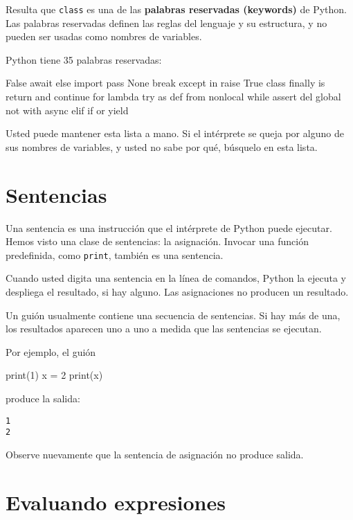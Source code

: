 Resulta que \texttt{class} es una de las \textbf{palabras reservadas
(keywords)} de Python. Las palabras reservadas definen las reglas
del lenguaje y su estructura, y no pueden ser usadas como nombres
de variables.


Python tiene 35 palabras reservadas:

\begin{pythoncode}
False      await      else       import     pass
None       break      except     in         raise
True       class      finally    is         return
and        continue   for        lambda     try
as         def        from       nonlocal   while
assert     del        global     not        with
async      elif       if         or         yield
\end{pythoncode}
 

Usted puede mantener esta lista a mano. Si el intérprete se queja
por alguno de sus nombres de variables, y usted no sabe por qué, búsquelo
en esta lista.

\section{Sentencias}

Una sentencia es una instrucción que el intérprete de Python puede
ejecutar. Hemos visto una clase de sentencias: la asignación. Invocar
una función predefinida, como \texttt{print}, también es una sentencia.

Cuando usted digita una sentencia en la línea de comandos, Python
la ejecuta y despliega el resultado, si hay alguno. Las asignaciones
no producen un resultado.

Un guión usualmente contiene una secuencia de sentencias. Si hay más
de una, los resultados aparecen uno a uno a medida que las sentencias
se ejecutan.

Por ejemplo, el guión

\begin{pythoncode}
print(1)
x = 2
print(x)
\end{pythoncode}
 produce la salida:
\begin{verbatim}
1
2
\end{verbatim}
Observe nuevamente que la sentencia de asignación no produce salida.

\section{Evaluando expresiones}

